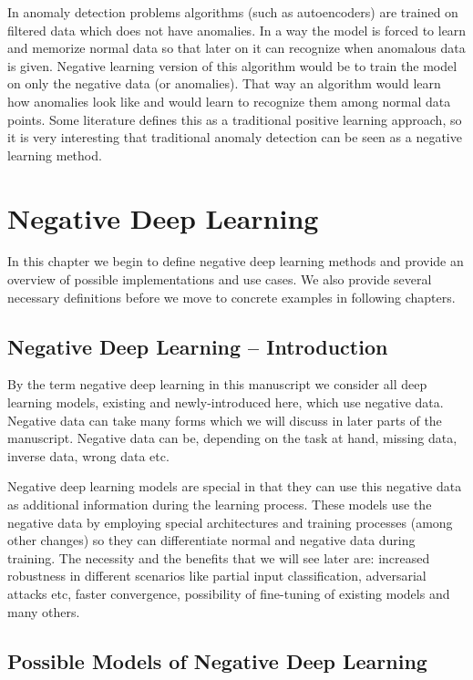\documentclass[b5paper]{book}
\begin{document}
In anomaly detection problems algorithms (such as autoencoders) are trained on filtered data which does not have anomalies. In a way the model is forced to learn and memorize normal data so that later on it can recognize when anomalous data is given. Negative learning version of this algorithm would be to train the model on only the negative data (or anomalies). That way an algorithm would learn how anomalies look like and would learn to recognize them among normal data points. Some literature defines this as a traditional positive learning approach, so it is very interesting that traditional anomaly detection can be seen as a negative learning method.

\chapter{Negative Deep Learning}

In this chapter we begin to define negative deep learning methods and provide an overview of possible implementations and use cases. We also provide several necessary definitions before we move to concrete examples in following chapters.

\section{Negative Deep Learning -- Introduction}

By the term negative deep learning in this manuscript we consider all deep learning models, existing and newly-introduced here, which use negative data. Negative data can take many forms which we will discuss in later parts of the manuscript. Negative data can be, depending on the task at hand, missing data, inverse data, wrong data etc.

Negative deep learning models are special in that they can use this negative data as additional information during the learning process. These models use the negative data by employing special architectures and training processes (among other changes) so they can differentiate normal and negative data during training. The necessity and the benefits that we will see later are: increased robustness in different scenarios like partial input classification, adversarial attacks etc, faster convergence, possibility of fine-tuning of existing models and many others.

\section{Possible Models of Negative Deep Learning}
\end{document}
